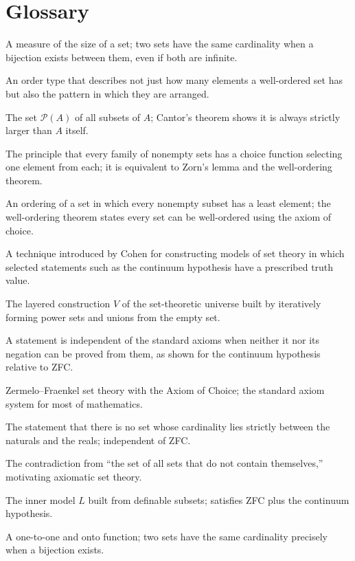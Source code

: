 \section*{Glossary}
\begin{description}[leftmargin=*,style=nextline,itemsep=0.3em]
\item[\textbf{Cardinality.}] A measure of the size of a set; two sets have the same cardinality when a bijection exists between them, even if both are infinite.
\item[\textbf{Ordinal.}] An order type that describes not just how many elements a well-ordered set has but also the pattern in which they are arranged.
\item[\textbf{Power set.}] The set $\mathcal{P}(A)$ of all subsets of $A$; Cantor's theorem shows it is always strictly larger than $A$ itself.
\item[\textbf{Axiom of choice.}] The principle that every family of nonempty sets has a choice function selecting one element from each; it is equivalent to Zorn's lemma and the well-ordering theorem.
\item[\textbf{Well-ordering.}] An ordering of a set in which every nonempty subset has a least element; the well-ordering theorem states every set can be well-ordered using the axiom of choice.
\item[\textbf{Forcing.}] A technique introduced by Cohen for constructing models of set theory in which selected statements such as the continuum hypothesis have a prescribed truth value.
\item[\textbf{Cumulative hierarchy.}] The layered construction $V$ of the set-theoretic universe built by iteratively forming power sets and unions from the empty set.
\item[\textbf{Independence.}] A statement is independent of the standard axioms when neither it nor its negation can be proved from them, as shown for the continuum hypothesis relative to ZFC.
\item[\textbf{ZFC.}] Zermelo--Fraenkel set theory with the Axiom of Choice; the standard axiom system for most of mathematics.
\item[\textbf{Continuum hypothesis.}] The statement that there is no set whose cardinality lies strictly between the naturals and the reals; independent of ZFC.
\item[\textbf{Russell's paradox.}] The contradiction from ``the set of all sets that do not contain themselves,'' motivating axiomatic set theory.
\item[\textbf{Constructible universe.}] The inner model $L$ built from definable subsets; satisfies ZFC plus the continuum hypothesis.
\item[\textbf{Bijection.}] A one-to-one and onto function; two sets have the same cardinality precisely when a bijection exists.
\end{description}
